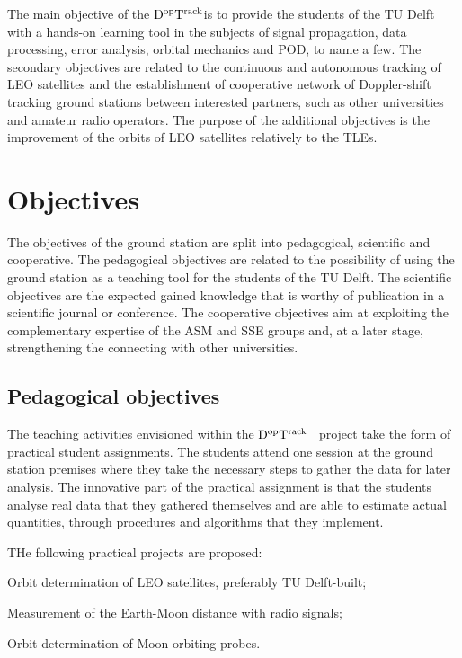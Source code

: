 \documentclass[11pt,a4paper,oneside]{article}
\newcommand{\GroundStationName}{${\rm D^{\rm op}T^{\rm rack}}$}
\newcommand{\listskip}{0pt}
\newenvironment{itemize*}
{\begin{itemize}
  \setlength{\itemsep}{\listskip}
  \setlength{\parskip}{\listskip}
  \setlength{\parsep}{\listskip}}
{\end{itemize}}
\begin{document}
The main objective of the \GroundStationName is to provide the students of the TU Delft with a hands-on learning tool in the subjects of signal propagation, data processing, error analysis, orbital mechanics and \ac{POD}, to name a few. The secondary objectives are related to the continuous and autonomous tracking of \ac{LEO} satellites and the establishment of cooperative network of Doppler-shift tracking ground stations between interested partners, such as other universities and amateur radio operators. The purpose of the additional objectives is the improvement of the orbits of \ac{LEO} satellites relatively to the \acp{TLE}.



\section{Objectives}

The objectives of the ground station are split into pedagogical, scientific and cooperative. The pedagogical objectives are related to the possibility of using the ground station as a teaching tool for the students of the TU Delft. The scientific objectives are the expected gained knowledge that is worthy of publication in a scientific journal or conference. The cooperative objectives aim at exploiting the complementary expertise of the \ac{ASM} and \ac{SSE} groups and, at a later stage, strengthening the connecting with other universities.



\subsection{Pedagogical objectives}

The teaching activities envisioned within the \GroundStationName~ project take the form of practical student assignments. The students attend one session at the ground station premises where they take the necessary steps to gather the data for later analysis. The innovative part of the practical assignment is that the students analyse real data that they gathered themselves and are able to estimate actual quantities, through procedures and algorithms that they implement.

THe following practical projects are proposed:

\begin{itemize*}
\item Orbit determination of \ac{LEO} satellites, preferably TU Delft-built;
\item Measurement of the Earth-Moon distance with radio signals;
\item Orbit determination of Moon-orbiting probes.
\end{itemize*}
\end{document}
